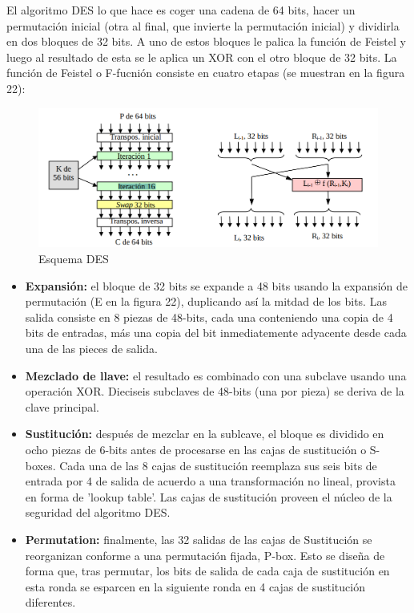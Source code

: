 \documentclass[a4paper,11pt]{article}
\begin{document}
El algoritmo DES lo que hace es coger una cadena de 64 bits, hacer un permutación inicial (otra al final, que invierte la permutación inicial) y dividirla en dos bloques de 32 bits. A uno de estos bloques le palica la función de Feistel y luego al resultado de esta se le aplica un XOR con el otro bloque de 32 bits. La función de Feistel o F-fucnión consiste en cuatro etapas (se muestran en la figura 22):

\begin{figure}[h]
\centering
\caption{Esquema DES}
\includegraphics[scale=1,width=1\textwidth]{esquema_DES.png}
\end{figure}

\begin{itemize}
\item \textbf{Expansión:} el bloque de 32 bits se expande a 48 bits usando la expansión de permutación (E en la figura 22), duplicando así la mitdad de los bits. Las salida consiste en 8 piezas de 48-bits, cada una conteniendo una copia de 4 bits de entradas, más una copia del bit inmediatemente adyacente desde cada una de las pieces de salida.

\item \textbf{Mezclado de llave:} el resultado es combinado con una subclave usando una operación XOR. Dieciseis subclaves de 48-bits (una por pieza) se deriva de la clave principal. 

\item \textbf{Sustitución:} después de mezclar en la sublcave, el bloque es dividido en ocho piezas de 6-bits antes de procesarse en las cajas de sustitución o S-boxes. Cada una de las 8 cajas de sustitución reemplaza sus seis bits de entrada por 4 de salida de acuerdo a una transformación no lineal, provista en forma de 'lookup table'. Las cajas de sustitución proveen el núcleo de la seguridad del algoritmo DES.

\item \textbf{Permutation:} finalmente, las 32 salidas de las cajas de Sustitución se reorganizan conforme a una permutación fijada, P-box. Esto se diseña de forma que, tras permutar, los bits de salida de cada caja de sustitución en esta ronda se esparcen en la siguiente ronda en 4 cajas de sustitución diferentes.
\end{itemize}
\end{document}
